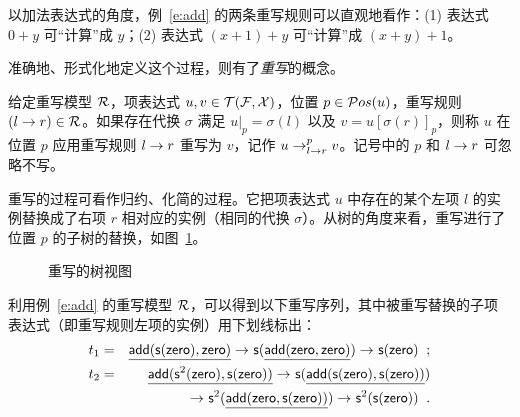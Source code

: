 以加法表达式的角度，例~\ref{e:add} 的两条重写规则可以直观地看作：(1) 表达式 $0+y$ 可“计算”成 $y$；(2) 表达式 $(x+1)+y$ 可“计算”成 $(x+y)+1$。

准确地、形式化地定义这个过程，则有了\emph{重写}的概念。

\begin{definition}[重写]
\label{d:rewriting}
给定重写模型 $\cR$，项表达式 $u,v\in\TFX$，位置 $p\in\Pos{u}$，重写规则 $(l \ra r) \in \cR$。如果存在代换 $\sigma$ 满足 $u|_p = \sigma(l)$ 以及 $v=u[\sigma(r)]_p$，则称 $u$ 在位置 $p$ 应用重写规则 $l\ra r$ 重写为 $v$，记作 $u\lrps{p}{l\ra r} v$。记号中的 $p$ 和 $l\ra r$ 可忽略不写。
\end{definition}

重写的过程可看作归约、化简的过程。它把项表达式 $u$ 中存在的某个左项 $l$ 的实例替换成了右项 $r$ 相对应的实例（相同的代换 $\sigma$）。从树的角度来看，重写进行了位置 $p$ 的子树的替换，如图~\ref{f:rewriting}。

\begin{figure}[htbp]
\centering
{}
\caption{重写的树视图}
\label{f:rewriting}
\end{figure}

\begin{example}
利用例~\ref{e:add} 的重写模型 $\cR$，可以得到以下重写序列，其中被重写替换的子项表达式（即重写规则左项的实例）用下划线标出：
\begin{eqnarray}
t_1 & = & \underline{\add(\s(\zero),\zero)} \lrps{}{} \s(\underline{\add(\zero,\zero)}) \lrps{}{} \s(\zero) \;\; ;\nonumber \\
t _2 & = & \underline{\add(\s^2(\zero),\s(\zero))} \lrps{}{} \s(\underline{\add(\s(\zero),\s(\zero))}) \nonumber\\ 
& & \lrps{}{} \s^2(\underline{\add(\zero,\s(\zero))}) \lrps{}{} \s^2(\s(\zero)) \;\; .\nonumber 
\end{eqnarray}
\end{example}

